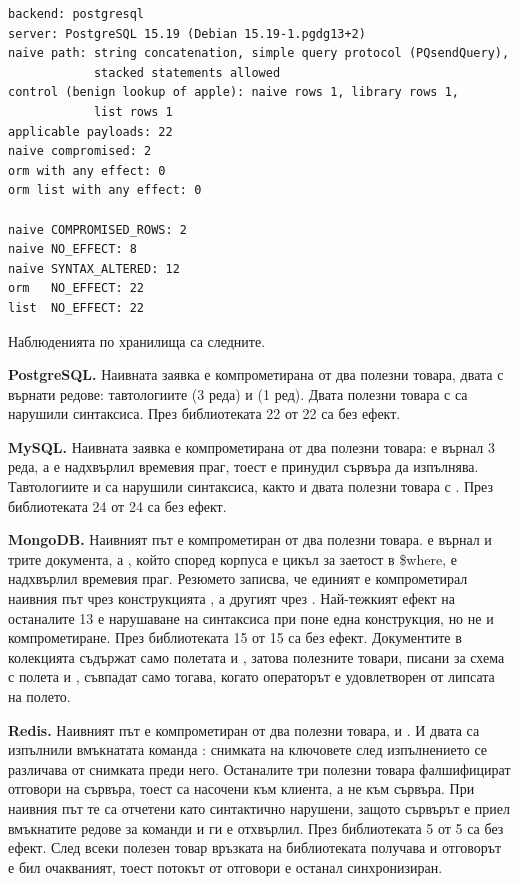 \begin{lstlisting}[language={},deletekeywords={orm},caption={Резюме на изпълнението с PostgreSQL (два реда са пренесени)},label={lst:eval-summary}]
backend: postgresql
server: PostgreSQL 15.19 (Debian 15.19-1.pgdg13+2)
naive path: string concatenation, simple query protocol (PQsendQuery),
            stacked statements allowed
control (benign lookup of apple): naive rows 1, library rows 1,
            list rows 1
applicable payloads: 22
naive compromised: 2
orm with any effect: 0
orm list with any effect: 0

naive COMPROMISED_ROWS: 2
naive NO_EFFECT: 8
naive SYNTAX_ALTERED: 12
orm   NO_EFFECT: 22
list  NO_EFFECT: 22
\end{lstlisting}

Наблюденията по хранилища са следните.

\textbf{PostgreSQL.} Наивната заявка е компрометирана от два полезни товара,
двата с върнати редове: тавтологиите  (3 реда) и 
(1 ред). Двата полезни товара с  са нарушили синтаксиса. През
библиотеката 22 от 22 са без ефект.

\textbf{MySQL.} Наивната заявка е компрометирана от два полезни товара:
 е върнал 3 реда, а  е надхвърлил времевия праг,
тоест е принудил сървъра да изпълнява. Тавтологиите  и
 са нарушили синтаксиса, както и двата полезни товара с
. През библиотеката 24 от 24 са без ефект.

\textbf{MongoDB.} Наивният път е компрометиран от два полезни товара.
 е върнал и трите документа, а , който според
корпуса е цикъл за заетост в {\ttfamily \$where}, е надхвърлил времевия праг.
Резюмето записва, че единият е компрометирал наивния път чрез конструкцията
, а другият чрез . Най-тежкият ефект на останалите 13 е нарушаване на синтаксиса при поне една
конструкция, но не и компрометиране. През библиотеката 15 от 15 са без ефект.
Документите в колекцията съдържат само полетата  и , затова
полезните товари, писани за схема с полета  и ,
съвпадат само тогава, когато операторът е удовлетворен от липсата на полето.

\textbf{Redis.} Наивният път е компрометиран от два полезни товара,
 и . И двата са изпълнили вмъкнатата команда
: снимката на ключовете след изпълнението се различава от снимката
преди него. Останалите три полезни товара фалшифицират отговори на сървъра, тоест
са насочени към клиента, а не към сървъра. При наивния път те са отчетени като
синтактично нарушени, защото сървърът е приел вмъкнатите редове за команди и ги
е отхвърлил. През
библиотеката 5 от 5 са без ефект. След всеки полезен товар връзката на
библиотеката получава  и отговорът е бил очакваният, тоест потокът от
отговори е останал синхронизиран.

